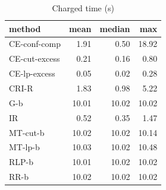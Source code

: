 \begin{table}[htbp]
\centering
\small
\caption{Charged time (s)}
\label{tab:E2b_head_to_head_budgets_b10_time}
\begin{tabular}{lrrr}
\toprule
method & mean & median & max \\
\midrule
CE-conf-comp & 1.91 & 0.50 & 18.92 \\
CE-cut-excess & 0.21 & 0.16 & 0.80 \\
CE-lp-excess & 0.05 & 0.02 & 0.28 \\
CRI-R & 1.83 & 0.98 & 5.22 \\
G-b & 10.01 & 10.02 & 10.02 \\
IR & 0.52 & 0.35 & 1.47 \\
MT-cut-b & 10.02 & 10.02 & 10.14 \\
MT-lp-b & 10.03 & 10.02 & 10.48 \\
RLP-b & 10.01 & 10.02 & 10.02 \\
RR-b & 10.02 & 10.02 & 10.02 \\
\bottomrule
\end{tabular}
\end{table}
